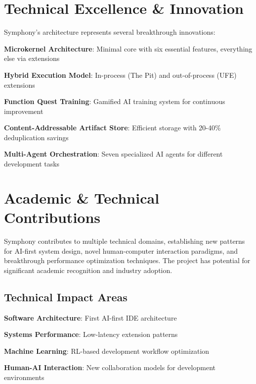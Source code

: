 \section*{Technical Excellence \& Innovation}

Symphony's architecture represents several breakthrough innovations:

\begin{expandedlist}
    \item \textbf{Microkernel Architecture}: Minimal core with six essential features, everything else via extensions
    \item \textbf{Hybrid Execution Model}: In-process (The Pit) and out-of-process (UFE) extensions
    \item \textbf{Function Quest Training}: Gamified AI training system for continuous improvement
    \item \textbf{Content-Addressable Artifact Store}: Efficient storage with 20-40\% deduplication savings
    \item \textbf{Multi-Agent Orchestration}: Seven specialized AI agents for different development tasks
\end{expandedlist}

\section*{Academic \& Technical Contributions}

\begin{alertbox}
Symphony contributes to multiple technical domains, establishing new patterns for AI-first system design, novel human-computer interaction paradigms, and breakthrough performance optimization techniques. The project has potential for significant academic recognition and industry adoption.
\end{alertbox}

\subsection*{Technical Impact Areas}
\begin{compactlist}
    \item \textbf{Software Architecture}: First  AI-first IDE architecture
    \item \textbf{Systems Performance}: Low-latency extension patterns
    \item \textbf{Machine Learning}: RL-based development workflow optimization
    \item \textbf{Human-AI Interaction}: New collaboration models for development environments
\end{compactlist}

